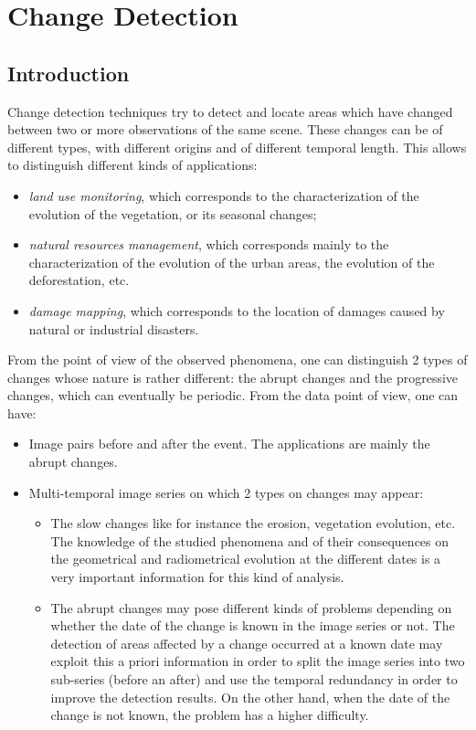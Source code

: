 \chapter{Change Detection}
\section{Introduction}
Change detection techniques try to detect and locate areas which have
changed between two or more observations of the same scene. These
changes can be of different types, with different origins and of
different temporal length. This allows to distinguish different kinds
of applications:
\begin{itemize}
\item \emph{land use monitoring}, which corresponds to the
  characterization of the evolution of the vegetation, or its seasonal
  changes;
\item \emph{natural resources management}, which corresponds mainly
  to the characterization of the evolution of the urban areas, the
  evolution of the deforestation, etc.
\item \emph{damage mapping}, which corresponds to the location of
  damages caused by natural or industrial disasters.
\end{itemize}

From the point of view of the observed phenomena, one can distinguish
2 types of changes whose nature is rather different: the abrupt
changes and the progressive changes, which can eventually be
periodic. From the data point of view, one can have:

       \begin{itemize}
       \item Image pairs before and after the event. The applications
       are mainly the abrupt changes.

	 \item Multi-temporal image series on which 2 types on changes
	 may appear:
	 \begin{itemize}
	   \item The slow changes like for instance the erosion,
	   vegetation evolution, etc. The knowledge of the studied
	   phenomena and of their consequences on the geometrical
	   and radiometrical evolution at the different dates is a
	   very important information for this kind of analysis.

	     \item The abrupt changes may pose different kinds of
	     problems depending on whether the date of the change is
	     known in the image series or not. The detection of areas
	     affected by a change occurred at a known date may exploit
	     this a priori information in order to split the image
	     series into two sub-series (before an after) and use the
	     temporal redundancy in order to improve the detection
	     results. On the other hand, when the date of the change
	     is not known, the problem has a higher difficulty.

	 \end{itemize}
	 
       \end{itemize}

